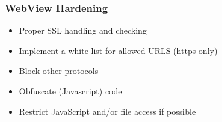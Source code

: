 \subsubsection{WebView Hardening}
\begin{itemize}
    \item Proper SSL handling and checking
    \item Implement a white-list for allowed URLS (https only)
    \item Block other protocols
    \item Obfuscate (Javascript) code
    \item Restrict JavaScript and/or file access if possible
\end{itemize}